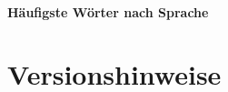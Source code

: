 \documentclass[12pt]{article}
\begin{document}
\paragraph{H\"aufigste W\"orter nach Sprache}







\section{Versionshinweise}




\cleardoublepage
{}
\nocite{*}
%
\end{document}
